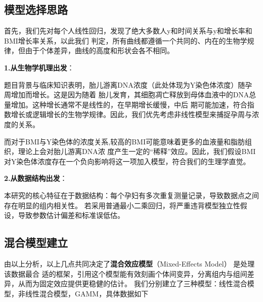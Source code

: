\documentclass{article}
\begin{document}
\subsection{\textbf{模型选择思路}}
首先，我们先对每个人线性回归，发现了绝大多数人y和时间关系与y和增长率和BMI增长率关系，以此我们
判定，所有曲线都遵循一个共同的、内在的生物学规律，但由于个体差异，曲线的高度和形状会各不相同。

\textbf{1.从生物学机理出发}：

题目背景与临床知识表明，胎儿游离DNA浓度（此处体现为Y染色体浓度）随孕周增加而增长。这是因为随着
胎儿发育，其细胞凋亡释放到母体血液中的DNA总量增加。这种增长通常不是线性的，在早期增长缓慢，中后
期可能加速，符合指数增长或逻辑增长的生物学规律。因此，我们优先考虑非线性模型来捕捉孕周与浓度的关系。

而对于BMI与Y染色体的浓度关系,较高的BMI可能意味着更多的血液量和脂肪组织，理论上会对胎儿游离DNA浓
度产生一定的“稀释”效应。因此，我们假设BMI对Y染色体浓度存在一个负向影响将这一项加入模型，符合我们的生理学直觉。

\textbf{2.从数据结构出发}：

本研究的核心特征在于数据结构：每个孕妇有多次重复测量记录，导致数据点之间存在明显的组内相关性。
若采用普通最小二乘回归，将严重违背模型独立性假设，导致参数估计偏差和标准误低估。

\subsection{\textbf{混合模型建立}}
由以上分析，以上几点共同决定了\textbf{混合效应模型}（Mixed-Effects Model） 是处理该数据最合
适的框架，引用这个模型能有效刻画个体间变异，分离组内与组间差异，从而为固定效应提供更稳健的估计。
我们分别建立了三种模型：线性混合模型，非线性混合模型，GAMM，具体数据如下
\end{document}
